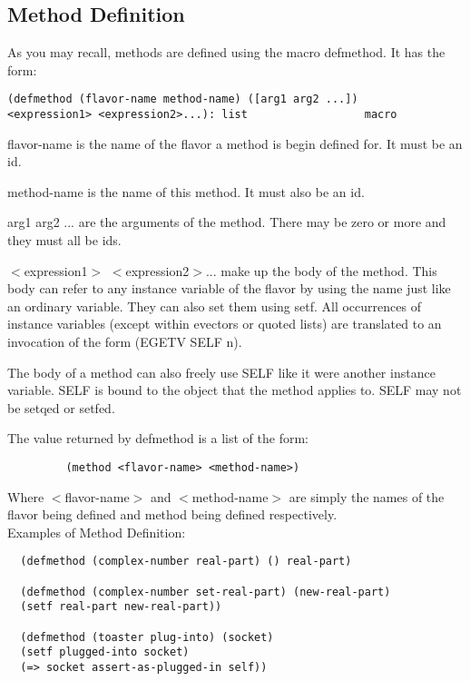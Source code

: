 \subsection{Method Definition}

  As you  may  recall,  methods  are  defined  using  the  macro
defmethod.  It has the form:

\begin{verbatim}
(defmethod (flavor-name method-name) ([arg1 arg2 ...])
<expression1> <expression2>...): list                  macro
\end{verbatim}
    flavor-name is the name of the flavor a method is begin
    defined for. It must be an id.

    method-name is the name of this method. It must also be an
    id.

    arg1 arg2 ... are the arguments of the method. There may be
    zero or more and they must all be ids.

    $<$expression1$>$  $<$expression2$>$... make up the body of the
    method. This body can refer to any instance variable of the
    flavor by using the name just  like  an  ordinary  variable.
    They  can  also  set  them  using  setf.  All occurrences of
    instance variables (except within evectors or quoted  lists)
    are translated to an invocation of the form (EGETV SELF n).

    The  body  of a method can also freely use SELF like it were
    another instance variable.  SELF is bound to the object that
    the method applies to.  SELF may not be setqed or setfed.

    The value returned by defmethod is a list of the form:

\begin{verbatim}
         (method <flavor-name> <method-name>)
\end{verbatim}

    Where $<$flavor-name$>$ and $<$method-name$>$ are simply the names
				of the flavor being defined and method being defined
    respectively.\\

  Examples of Method Definition:

\begin{verbatim}
  (defmethod (complex-number real-part) () real-part)

  (defmethod (complex-number set-real-part) (new-real-part)
  (setf real-part new-real-part))

  (defmethod (toaster plug-into) (socket)
  (setf plugged-into socket)
  (=> socket assert-as-plugged-in self))
\end{verbatim}
